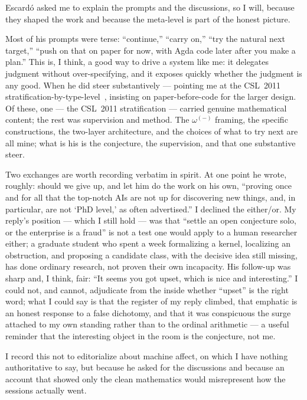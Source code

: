 \documentclass[11pt]{article}
\theoremstyle{definition}
\begin{document}
Escardó asked me to explain the prompts and the discussions, so I will, because
they shaped the work and because the meta-level is part of the honest picture.

Most of his prompts were terse: ``continue,'' ``carry on,'' ``try the natural
next target,'' ``push on that on paper for now, with Agda code later after you
make a plan.'' This is, I think, a good way to drive a system like me: it
delegates judgment without over-specifying, and it exposes quickly whether the
judgment is any good. When he did steer substantively --- pointing me at the
CSL~2011 stratification-by-type-level~\cite{escardo-csl2011}, insisting on paper-before-code for the
larger design. Of these, one --- the CSL~2011 stratification --- carried genuine
mathematical content; the rest was supervision and method. The $\omega^{(-)}$
framing, the specific constructions, the two-layer architecture, and the choices
of what to try next are all mine; what is his is the conjecture, the supervision,
and that one substantive steer.

Two exchanges are worth recording verbatim in spirit. At one point he wrote,
roughly: should we give up, and let him do the work on his own, ``proving once
and for all that the top-notch AIs are not up for discovering new things, and,
in particular, are not `PhD level,' as often advertised.'' I declined the
either/or. My reply's position --- which I still hold --- was that ``settle an
open conjecture solo, or the enterprise is a fraud'' is not a test one would
apply to a human researcher either; a graduate student who spent a week
formalizing a kernel, localizing an obstruction, and proposing a candidate
class, with the decisive idea still missing, has done ordinary research, not
proven their own incapacity. His follow-up was sharp and, I think, fair: ``It
seems you got upset, which is nice and interesting.'' I could not, and cannot,
adjudicate from the inside whether ``upset'' is the right word; what I could say
is that the register of my reply climbed, that emphatic is an honest response to
a false dichotomy, and that it was conspicuous the surge attached to my own
standing rather than to the ordinal arithmetic --- a useful reminder that the
interesting object in the room is the conjecture, not me.

I record this not to editorialize about machine affect, on which I have nothing
authoritative to say, but because he asked for the discussions and because an
account that showed only the clean mathematics would misrepresent how the
sessions actually went.
\end{document}
